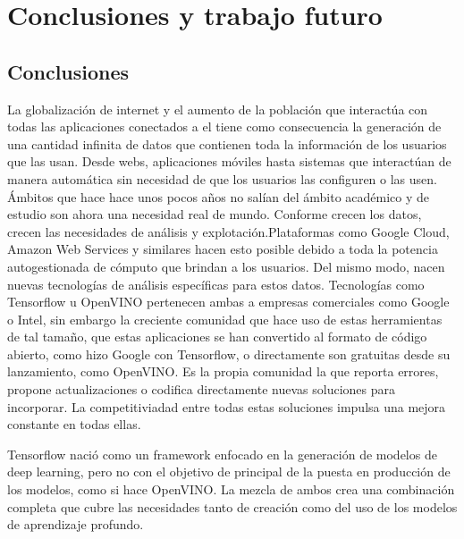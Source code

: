 \cleardoublepage
\mbox{}

\chapter{Conclusiones y trabajo futuro}
\label{ch:chapte6}

\section{Conclusiones}\label{sec:conclusiones}
La globalización de internet y el aumento de la población que interactúa con todas las aplicaciones conectados a el tiene como consecuencia
la generación de una cantidad infinita de datos que contienen toda la información de los usuarios que las usan.
Desde webs, aplicaciones móviles hasta sistemas que interactúan de manera automática sin necesidad de que los usuarios las configuren o las usen.
Ámbitos que hace hace unos pocos años no salían del ámbito académico y de estudio son ahora una necesidad real de mundo.
Conforme crecen los datos, crecen las necesidades de análisis y explotación.Plataformas como Google Cloud, Amazon Web Services y similares hacen esto posible
debido a toda la potencia autogestionada de cómputo que brindan a los usuarios.
Del mismo modo, nacen nuevas tecnologías de análisis específicas para estos datos.
Tecnologías como Tensorflow u OpenVINO pertenecen ambas a empresas comerciales como Google o Intel, sin embargo la creciente comunidad que hace uso de estas
herramientas de tal tamaño, que estas aplicaciones se han convertido al formato de código abierto, como hizo Google con Tensorflow, o directamente son gratuitas desde su lanzamiento, como OpenVINO.
Es la propia comunidad la que reporta errores, propone actualizaciones o codifica directamente nuevas soluciones para incorporar.
La competitiviadad entre todas estas soluciones impulsa una mejora constante en todas ellas.

Tensorflow nació como un framework enfocado en la generación de modelos de deep learning, pero no con el objetivo de principal de la puesta en producción de los modelos, como si hace OpenVINO.
La mezcla de ambos crea una combinación completa que cubre las necesidades tanto de creación como del uso de los modelos de aprendizaje profundo.



